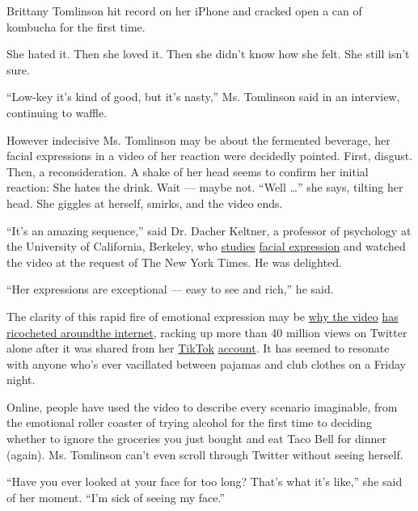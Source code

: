Brittany Tomlinson hit record on her iPhone and cracked open a can of
kombucha for the first time.

She hated it. Then she loved it. Then she didn't know how she felt. She
still isn't sure.

``Low-key it's kind of good, but it's nasty,'' Ms. Tomlinson said in an
interview, continuing to waffle.

However indecisive Ms. Tomlinson may be about the fermented beverage,
her facial expressions in a video of her reaction were decidedly
pointed. First, disgust. Then, a reconsideration. A shake of her head
seems to confirm her initial reaction: She hates the drink. Wait ---
maybe not. ``Well \ldots{}'' she says, tilting her head. She giggles at
herself, smirks, and the video ends.

``It's an amazing sequence,'' said Dr. Dacher Keltner, a professor of
psychology at the University of California, Berkeley, who
\href{https://psycnet.apa.org/doiLanding?doi=10.1037\%2Famp0000488}{studies}
\href{https://www.alancowen.com/face}{facial expression} and watched the
video at the request of The New York Times. He was delighted.

``Her expressions are exceptional --- easy to see and rich,'' he said.

The clarity of this rapid fire of emotional expression may be
\href{https://www.buzzfeed.com/daniellaemanuel/woman-trying-kombucha-meme}{why
the video}
\href{https://www.dailydot.com/unclick/trying-kombucha-reaction-meme-tiktok/}{has
ricocheted
around}\href{https://mashable.com/article/tiktok-trying-kombucha-reaction-meme/}{the
internet}, racking up more than 40 million views on Twitter alone after
it was shared from her
\href{https://www.nytimes3xbfgragh.onion/2019/03/10/style/what-is-tik-tok.html}{TikTok}
\href{https://www.tiktok.com/@brittany_broski/video/6722234609188310277}{account}.
It has seemed to resonate with anyone who's ever vacillated between
pajamas and club clothes on a Friday night.

Online, people have used the video to describe every scenario
imaginable, from the emotional roller coaster of trying alcohol for the
first time to deciding whether to ignore the groceries you just bought
and eat Taco Bell for dinner (again). Ms. Tomlinson can't even scroll
through Twitter without seeing herself.

``Have you ever looked at your face for too long? That's what it's
like,'' she said of her moment. ``I'm sick of seeing my face.''

